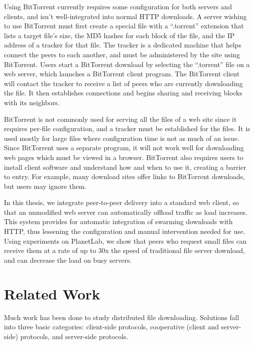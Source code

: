 Using BitTorrent currently requires some configuration for both servers and clients, and isn't well-integrated into normal HTTP downloads.  A server wishing to use BitTorrent 
must first create a special file with a ``.torrent'' extension that lists a target file's size, the MD5 hashes for each block of the file, and 
the IP address of a tracker for that file.  The tracker is a dedicated machine that helps connect the peers to each another, and must be administered
by the site using BitTorrent.  Users start a BitTorrent download by selecting the ``.torrent'' file on a web server, which launches a BitTorrent client program.
The BitTorrent client will contact the tracker to receive a list of peers who are currently downloading the file.  It then establishes connections and 
begins sharing and receiving blocks with its neighbors.


BitTorrent is not commonly used for serving all the files of a web site since it requires per-file configuration, and a tracker must be established for the files.  It is used mostly for large files where
configuration time is not as much of an issue.  Since BitTorrent uses a separate program, it will not work well for downloading web pages which must be viewed in a browser.  
BitTorrent also requires users to install client software and understand how and when to use it, creating a barrier to entry.  For example, many download sites offer links to BitTorrent downloads,
but users may ignore them.

In this thesis, we integrate peer-to-peer delivery into a standard web client, so that an unmodified web server can automatically offload traffic as load increases. 
This system provides for automatic integration of swarming downloads with HTTP, thus lessening the configuration and manual intervention needed for use.
Using experiments on PlanetLab, we show that peers who request small files can receive them at a rate of up to 30x the speed of traditional file server download, and
can decrease the load on busy servers.  

\section{Related Work}
Much work has been done to study distributed file downloading.  Solutions fall into three basic categories: client-side protocols, cooperative (client and server-side) protocols, 
and server-side protocols.

